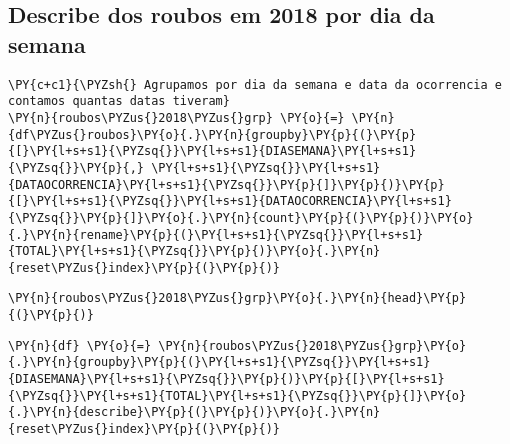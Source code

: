     \hypertarget{describe-dos-roubos-em-2018-por-dia-da-semana}{%
\subsection*{Describe dos roubos em 2018 por dia da
semana}\label{describe-dos-roubos-em-2018-por-dia-da-semana}}

    \begin{tcolorbox}[breakable, size=fbox, boxrule=1pt, pad at break*=1mm,colback=cellbackground, colframe=cellborder]
\begin{Verbatim}[commandchars=\\\{\}]
\PY{c+c1}{\PYZsh{} Agrupamos por dia da semana e data da ocorrencia e contamos quantas datas tiveram}
\PY{n}{roubos\PYZus{}2018\PYZus{}grp} \PY{o}{=} \PY{n}{df\PYZus{}roubos}\PY{o}{.}\PY{n}{groupby}\PY{p}{(}\PY{p}{[}\PY{l+s+s1}{\PYZsq{}}\PY{l+s+s1}{DIASEMANA}\PY{l+s+s1}{\PYZsq{}}\PY{p}{,} \PY{l+s+s1}{\PYZsq{}}\PY{l+s+s1}{DATAOCORRENCIA}\PY{l+s+s1}{\PYZsq{}}\PY{p}{]}\PY{p}{)}\PY{p}{[}\PY{l+s+s1}{\PYZsq{}}\PY{l+s+s1}{DATAOCORRENCIA}\PY{l+s+s1}{\PYZsq{}}\PY{p}{]}\PY{o}{.}\PY{n}{count}\PY{p}{(}\PY{p}{)}\PY{o}{.}\PY{n}{rename}\PY{p}{(}\PY{l+s+s1}{\PYZsq{}}\PY{l+s+s1}{TOTAL}\PY{l+s+s1}{\PYZsq{}}\PY{p}{)}\PY{o}{.}\PY{n}{reset\PYZus{}index}\PY{p}{(}\PY{p}{)}
\end{Verbatim}
\end{tcolorbox}

    \begin{tcolorbox}[breakable, size=fbox, boxrule=1pt, pad at break*=1mm,colback=cellbackground, colframe=cellborder]
\begin{Verbatim}[commandchars=\\\{\}]
\PY{n}{roubos\PYZus{}2018\PYZus{}grp}\PY{o}{.}\PY{n}{head}\PY{p}{(}\PY{p}{)}
\end{Verbatim}
\end{tcolorbox}

    \begin{tcolorbox}[breakable, size=fbox, boxrule=1pt, pad at break*=1mm,colback=cellbackground, colframe=cellborder]
\begin{Verbatim}[commandchars=\\\{\}]
\PY{n}{df} \PY{o}{=} \PY{n}{roubos\PYZus{}2018\PYZus{}grp}\PY{o}{.}\PY{n}{groupby}\PY{p}{(}\PY{l+s+s1}{\PYZsq{}}\PY{l+s+s1}{DIASEMANA}\PY{l+s+s1}{\PYZsq{}}\PY{p}{)}\PY{p}{[}\PY{l+s+s1}{\PYZsq{}}\PY{l+s+s1}{TOTAL}\PY{l+s+s1}{\PYZsq{}}\PY{p}{]}\PY{o}{.}\PY{n}{describe}\PY{p}{(}\PY{p}{)}\PY{o}{.}\PY{n}{reset\PYZus{}index}\PY{p}{(}\PY{p}{)}
\end{Verbatim}
\end{tcolorbox}

